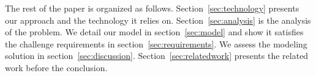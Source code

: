 

The rest of the paper is organized as follows. Section~\ref{sec:technology} presents our approach and the technology it relies on. Section~\ref{sec:analysis} is the analysis of the problem. We detail our model in section~\ref{sec:model} and show it satisfies the challenge requirements in section~\ref{sec:requirements}. We assess the modeling solution in section~\ref{sec:discussion}. Section~\ref{sec:relatedwork} presents the related work before the conclusion.%






